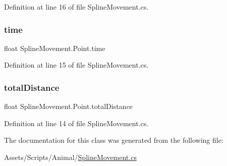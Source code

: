 Definition at line 16 of file Spline\+Movement.\+cs.

\mbox{\label{class_spline_movement_1_1_point_a2a8d6c1ba692ddada5db080549831d3c}} 
\subsubsection{\texorpdfstring{time}{time}}
{\footnotesize\ttfamily float Spline\+Movement.\+Point.\+time}



Definition at line 15 of file Spline\+Movement.\+cs.

\mbox{\label{class_spline_movement_1_1_point_a02269ce5594bf2a1cd45a7a218d2b33e}} 
\subsubsection{\texorpdfstring{total\+Distance}{totalDistance}}
{\footnotesize\ttfamily float Spline\+Movement.\+Point.\+total\+Distance}



Definition at line 14 of file Spline\+Movement.\+cs.



The documentation for this class was generated from the following file\+:\begin{DoxyCompactItemize}
\item 
Assets/\+Scripts/\+Animal/\mbox{\hyperlink{_spline_movement_8cs}{Spline\+Movement.\+cs}}\end{DoxyCompactItemize}
